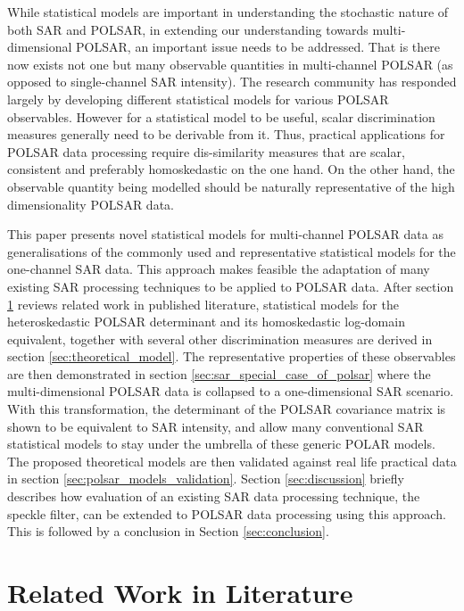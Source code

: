 \documentclass[journal,12pt,draftcls,onecolumn]{IEEEtran}
\begin{document}
While statistical models are important in understanding the stochastic nature of both SAR and POLSAR, in extending our understanding towards multi-dimensional POLSAR, an important issue needs to be addressed.
That is there now exists not one but many observable quantities in multi-channel POLSAR (as opposed to single-channel SAR intensity).
The research community has responded largely by developing different statistical models for various POLSAR observables.
However for a statistical model to be useful, scalar discrimination measures generally need to be derivable from it.
Thus, practical applications for POLSAR data processing require dis-similarity measures that are scalar, consistent and preferably homoskedastic on the one hand.
On the other hand, the observable quantity being modelled should be naturally representative of the high dimensionality POLSAR data.

This paper presents novel statistical models for multi-channel POLSAR data as generalisations of the commonly used and representative statistical models for the one-channel SAR data.
This approach makes feasible the adaptation of many existing SAR processing techniques to be applied to POLSAR data.
After section \ref{sec:lit_review} reviews related work in published literature, statistical models for the heteroskedastic POLSAR determinant and its homoskedastic log-domain equivalent, together with several other discrimination measures are derived in section  \ref{sec:theoretical_model}.
The representative properties of these observables are then demonstrated in section \ref{sec:sar_special_case_of_polsar}
  where the multi-dimensional POLSAR data is collapsed to a one-dimensional SAR scenario.
With this transformation, the determinant of the POLSAR covariance matrix is shown to be equivalent to SAR intensity,
  and allow many conventional SAR statistical models to stay under the umbrella of these generic POLAR models.
The proposed theoretical models are then validated against real life practical data in section \ref{sec:polsar_models_validation}.
Section \ref{sec:discussion} briefly describes how evaluation of an existing SAR data processing technique, the speckle filter, can be extended to  POLSAR data processing using this approach.
This is followed by a conclusion in Section \ref{sec:conclusion}.

\section{Related Work in Literature}
\label{sec:lit_review}
\end{document}
